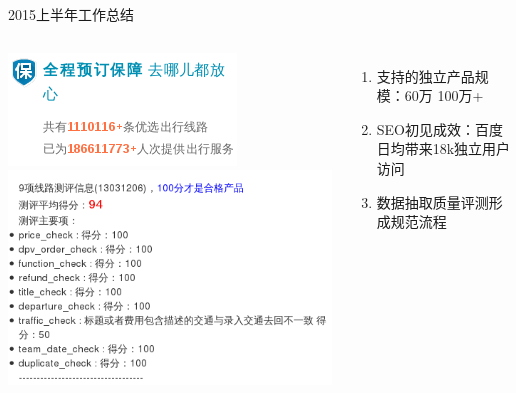 \documentclass{beamer}
\begin{document}
\begin{CJK}{UTF8}{gbsn}
\begin{frame}{2015上半年工作总结}
  \begin{columns}
    \begin{center}
       {\includegraphics[scale=0.5]{./images/product-scale}}
       {\includegraphics[scale=0.3]{./images/route-quality}}
    \end{center}
    \begin{enumerate}\setcounter{enumi}{0}
      \item<2-> 支持的独立产品规模：60万  100万+
      \item<3-> SEO初见成效：百度日均带来18k独立用户访问
      \item<4-> 数据抽取质量评测形成规范流程
    \end{enumerate}
  \end{columns}
\end{frame}


\end{CJK}
\end{document}
